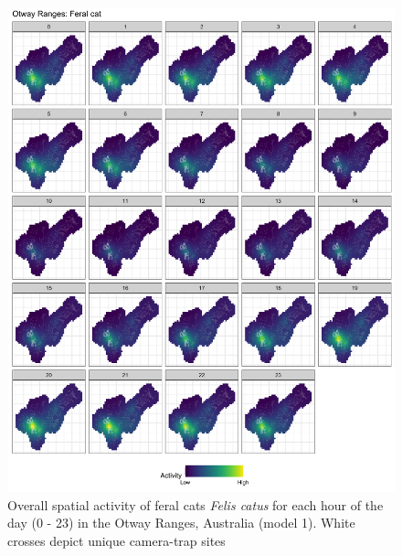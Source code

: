\documentclass[11pt,a4paper,titlepage,twoside,openright]{style/unimelbthesis}
\begin{document}
\begin{mainmatter}
\begin{figure}
{\centering \includegraphics[width=1\linewidth]{figure/spte_facet_o_cat} 

}

\caption{Overall spatial activity of feral cats \textit{Felis catus} for each hour of the day (0 - 23) in the Otway Ranges, Australia (model 1). White crosses depict unique camera-trap sites}\label{fig:diel-space-o-cat}
\end{figure}
\end{mainmatter}
\end{document}
